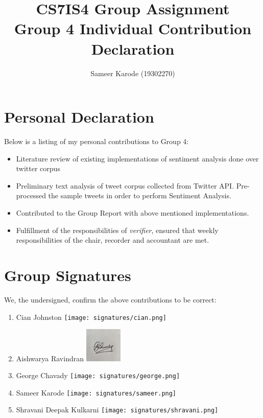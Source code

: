 \documentclass[a4paper,10pt]{article}
\begin{document}
\title{
    CS7IS4 Group Assignment \\
    \large Group 4 Individual Contribution Declaration
}
\author{
    Sameer Karode (19302270)
}

\maketitle

\section{Personal Declaration}

Below is a listing of my personal contributions to Group 4:

\begin{itemize}
    \item {Literature review of existing implementations of sentiment analysis done over twitter corpus}
    \item{
        Preliminary text analysis of tweet corpus collected from Twitter API. Pre-processed the sample tweets in order to perform Sentiment Analysis.
    }
    \item{
       Contributed to the Group Report with above mentioned implementations.
    }
    \item{
        Fulfillment of the responsibilities of \textit{verifier}, ensured that weekly responsibilities of the chair, recorder and accountant are met.
    }
\end{itemize}

\section{Group Signatures}

We, the undersigned, confirm the above contributions to be correct:

\begin{enumerate}
    \item{
        Cian Johnston \texttt{[image: signatures/cian.png]}
    }
    \item{
        Aishwarya Ravindran \includegraphics[width=0.7in]{signatures/Aishwarya.jpeg}
    }
    \item{
        George Chavady \texttt{[image: signatures/george.png]}
    }
    \item{
        Sameer Karode \texttt{[image: signatures/sameer.png]}
    }
    \item{
        Shravani Deepak Kulkarni \texttt{[image: signatures/shravani.png]}
    }

\end{enumerate}
\end{document}
